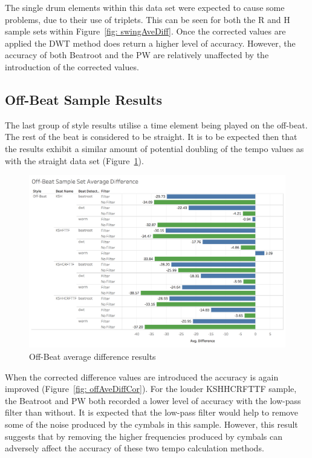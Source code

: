 \documentclass[a4paper, 11pt]{article}
\begin{document}
The single drum elements within this data set were expected to cause some problems, due to their use of triplets. This can be seen for both the R and H sample sets within Figure~\ref{fig: swingAveDiff}. Once the corrected values are applied the DWT method does return a higher level of accuracy. However, the accuracy of both Beatroot and the PW are relatively unaffected by the introduction of the corrected values.

\subsection{Off-Beat Sample Results}

The last group of style results utilise a time element being played on the off-beat. The rest of the beat is considered to be straight. It is to be expected then that the results exhibit a similar amount of potential doubling of the tempo values as with the straight data set (Figure~\ref{fig: offAveDiff}).

\begin{figure}[htbp]
\centering
\includegraphics[scale=0.25]{images/OBSSAD.jpg}
\caption{Off-Beat average difference results}
\label{fig: offAveDiff}
\end{figure}

When the corrected difference values are introduced the accuracy is again improved (Figure~\ref{fig: offAveDiffCor}). For the louder KSHHCRFTTF sample, the Beatroot and PW both recorded a lower level of accuracy with the low-pass filter than without. It is expected that the low-pass filter would help to remove some of the noise produced by the cymbals in this sample. However, this result suggests that by removing the higher frequencies produced by cymbals can adversely affect the accuracy of these two tempo calculation methods.
\end{document}
